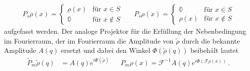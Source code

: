 \begin{align}
	P_s\rho (x)=\begin{cases}
	\rho (x)  &\text{für } x\in S\\
	\mathbb{0}  &\text{für }x\notin S
	\end{cases} &   &   
	P_{\bar{s}}\rho (x)=\begin{cases}
	\mathbb{0} &\text{für } x\in S\\
	\rho (x)   &\text{für }x\notin S
	\end{cases}
\end{align}
aufgefasst werden. Der analoge Projektor für die Erfüllung der Nebenbedingung im Fourierraum, der im Fourierraum die Amplitude von $\tilde{\rho}$ durch die bekannte Amplitude $A(q)$ ersetzt und dabei den Winkel $\Phi\left(\tilde{\rho}\left(q\right)\right)$ beibehält lautet
\begin{align}
	\tilde{P}_m \tilde{\rho}(q) & =A(q)e^{i\Phi(\tilde{\rho})} &   & P_m\rho(x)=\mathscr{F}^{-1}A(q)e^{i\Phi\left(\mathscr{F}\rho\left(x\right)\right)} \,. 
\end{align}

